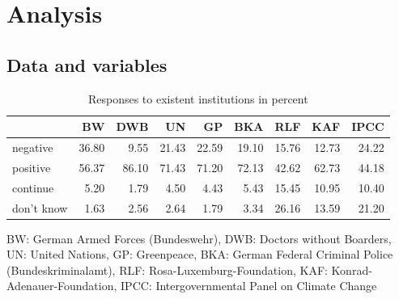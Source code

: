 \documentclass[Royal,times,sageh]{sagej}
\begin{document}
\hypertarget{analysis}{%
\section{Analysis}\label{analysis}}

\hypertarget{data-and-variables}{%
\subsection{Data and variables}\label{data-and-variables}}

\begin{table}

\begin{threeparttable}
\caption{\label{tab:unnamed-chunk-1}\label{tab:freqs}Responses to existent institutions in percent}
\centering
\begin{tabular}[t]{lrrrrrrrr}
\toprule
  & BW & DWB & UN & GP & BKA & RLF & KAF & IPCC\\
\midrule
negative & 36.80 & 9.55 & 21.43 & 22.59 & 19.10 & 15.76 & 12.73 & 24.22\\
positive & 56.37 & 86.10 & 71.43 & 71.20 & 72.13 & 42.62 & 62.73 & 44.18\\
continue & 5.20 & 1.79 & 4.50 & 4.43 & 5.43 & 15.45 & 10.95 & 10.40\\
don't know & 1.63 & 2.56 & 2.64 & 1.79 & 3.34 & 26.16 & 13.59 & 21.20\\
\bottomrule
\end{tabular}
\begin{tablenotes}
\small
\item [] BW: German Armed Forces (Bundeswehr), DWB: Doctors without Boarders, UN: United Nations, GP: Greenpeace, BKA: German Federal Criminal Police (Bundeskriminalamt), RLF: Rosa-Luxemburg-Foundation, KAF: Konrad-Adenauer-Foundation, IPCC: Intergovernmental Panel on Climate Change
\end{tablenotes}
\end{threeparttable}
\end{table}
\end{document}
